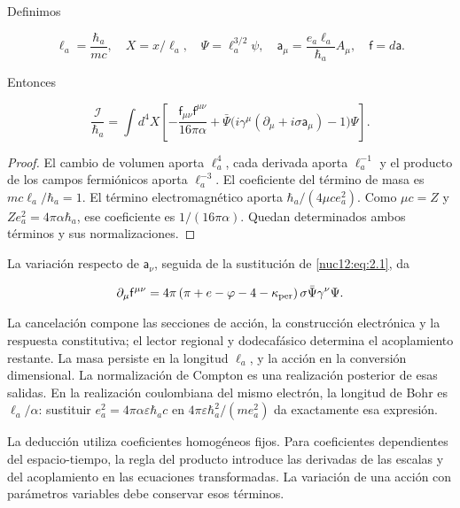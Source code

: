Definimos



\[
\ell_a=\frac{\hbar_a}{mc},\quad X=x/\ell_a,\quad
\Psi=\ell_a^{3/2}\psi,\quad
\mathsf a_\mu=\frac{e_a\ell_a}{\hbar_a}A_\mu,\quad
\mathsf f=d\mathsf a.
\]



Entonces



\begin{equation}
\boxed{\frac{\mathcal I}{\hbar_a}=
\int d^4X\left[
-\frac{\mathsf f_{\mu\nu}\mathsf f^{\mu\nu}}{16\pi\alpha}
+\bar\Psi\bigl(i\gamma^\mu(\partial_\mu+i\sigma\mathsf a_\mu)-1\bigr)\Psi
\right].}
\label{nuc12:eq:3.3}
\end{equation}



\begin{proof}
El cambio de volumen aporta \(\ell_a^4\), cada derivada aporta \(\ell_a^{-1}\) y el producto de los campos fermiónicos aporta \(\ell_a^{-3}\). El coeficiente del término de masa es \(mc\ell_a/\hbar_a=1\). El término electromagnético aporta \(\hbar_a/(4\mu c e_a^2)\). Como \(\mu c=Z\) y \(Ze_a^2=4\pi\alpha\hbar_a\), ese coeficiente es \(1/(16\pi\alpha)\). Quedan determinados ambos términos y sus normalizaciones.
\end{proof}

La variación respecto de \(\mathsf a_\nu\), seguida de la sustitución de \eqref{nuc12:eq:2.1}, da



\begin{equation}
\partial_\mu\mathsf f^{\mu\nu}
=4\pi\left(\pi+e-\varphi-4-\kappa_{\rm per}\right)
\sigma\bar\Psi\gamma^\nu\Psi .
\label{nuc12:eq:3.4}
\end{equation}



La cancelación compone las secciones de acción, la construcción electrónica y la respuesta constitutiva; el lector regional y dodecafásico determina el acoplamiento restante. La masa persiste en la longitud \(\ell_a\), y la acción en la conversión dimensional. La normalización de Compton es una realización posterior de esas salidas. En la realización coulombiana del mismo electrón, la longitud de Bohr es \(\ell_a/\alpha\): sustituir \(e_a^2=4\pi\alpha\varepsilon\hbar_a c\) en \(4\pi\varepsilon\hbar_a^2/(m e_a^2)\) da exactamente esa expresión.

La deducción utiliza coeficientes homogéneos fijos. Para coeficientes dependientes del espacio-tiempo, la regla del producto introduce las derivadas de las escalas y del acoplamiento en las ecuaciones transformadas. La variación de una acción con parámetros variables debe conservar esos términos.

